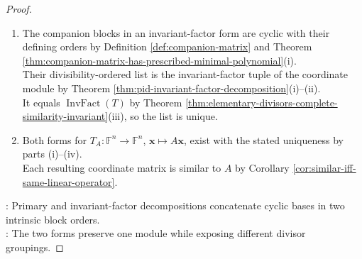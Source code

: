 \begin{theorem}
\begin{proof}
\begin{enumerate}[label=(\roman*)]
\item The companion blocks in an invariant-factor form are cyclic with their defining orders by Definition \ref{def:companion-matrix} and Theorem \ref{thm:companion-matrix-has-prescribed-minimal-polynomial}(i).\\
Their divisibility-ordered list is the invariant-factor tuple of the coordinate module by Theorem \ref{thm:pid-invariant-factor-decomposition}(i)--(ii).\\
It equals $\operatorname{InvFact}(T)$ by Theorem \ref{thm:elementary-divisors-complete-similarity-invariant}(iii), so the list is unique.
\item Both forms for $T_A:\mathbb{F}^n\to\mathbb{F}^n$, $\mathbf{x}\mapsto A\mathbf{x}$, exist with the stated uniqueness by parts (i)--(iv).\\
Each resulting coordinate matrix is similar to $A$ by Corollary \ref{cor:similar-iff-same-linear-operator}.
\end{enumerate}
: Primary and invariant-factor decompositions concatenate cyclic bases in two intrinsic block orders.\\
: The two forms preserve one module while exposing different divisor groupings.
\end{proof}
\end{theorem}

